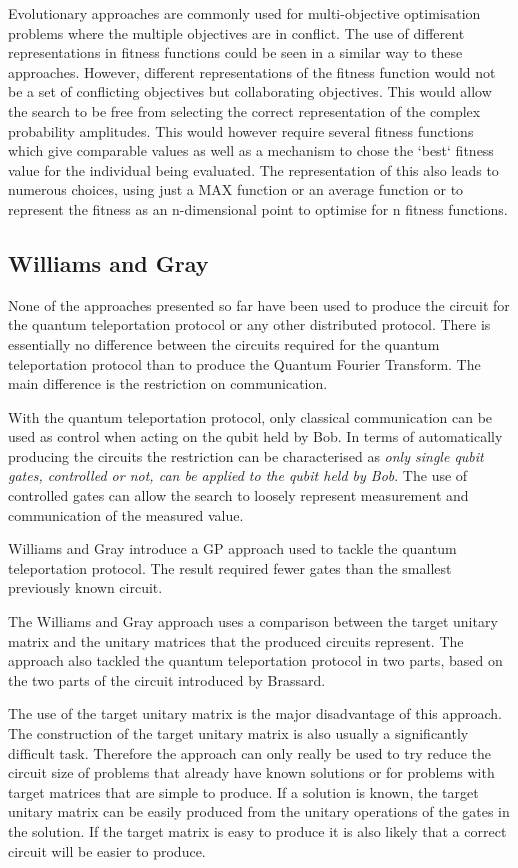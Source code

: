 Evolutionary approaches are commonly used for multi-objective optimisation problems where the multiple objectives are in conflict.
The use of different representations in fitness functions could be seen in a similar way to these approaches.
However, different representations of the fitness function would not be a set of conflicting objectives but collaborating objectives.
This would allow the search to be free from selecting the correct representation of the complex probability amplitudes.
This would however require several fitness functions which give comparable values as well as a mechanism to chose the `best` fitness value for the individual being evaluated.
The representation of this also leads to numerous choices, using just a MAX function or an average function or to represent the fitness as an n-dimensional point to optimise for n fitness functions.

\subsection{Williams and Gray}
None of the approaches presented so far have been used to produce the circuit for the quantum teleportation protocol or any other distributed protocol.
There is essentially no difference between the circuits required for the quantum teleportation protocol than to produce the Quantum Fourier Transform.
The main difference is the restriction on communication.

With the quantum teleportation protocol, only classical communication can be used as control when acting on the qubit held by Bob.
In terms of automatically producing the circuits the restriction can be characterised as \emph{only single qubit gates, controlled or not, can be applied to the qubit held by Bob}.
The use of controlled gates can allow the search to loosely represent measurement and communication of the measured value.

Williams and Gray\cite{Williams:1998:ADQ:645812.670824} introduce a GP approach used to tackle the quantum teleportation protocol.
The result required fewer gates than the smallest previously known circuit.

The Williams and Gray approach uses a comparison between the target unitary matrix and the unitary matrices that the produced circuits represent.
The approach also tackled the quantum teleportation protocol in two parts, based on the two parts of the circuit introduced by Brassard\cite{1998PhyDBrassard}.

The use of the target unitary matrix is the major disadvantage of this approach.
The construction of the target unitary matrix is also usually a significantly difficult task.
Therefore the approach can only really be used to try reduce the circuit size of problems that already have known solutions or for problems with target matrices that are simple to produce.
If a solution is known, the target unitary matrix can be easily produced from the unitary operations of the gates in the solution.
If the target matrix is easy to produce it is also likely that a correct circuit will be easier to produce.

